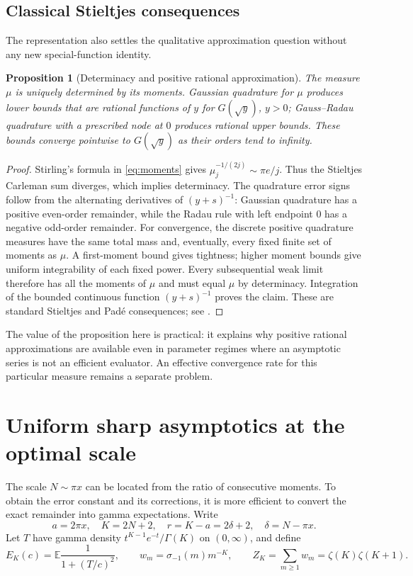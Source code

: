 \documentclass[11pt]{article}
\numberwithin{equation}{section}
\newtheorem{proposition}[theorem]{Proposition}
\theoremstyle{definition}
\theoremstyle{remark}
\newcommand{\E}{\mathbb E}
\begin{document}
\subsection{Classical Stieltjes consequences}

The representation also settles the qualitative approximation question
without any new special-function identity.

\begin{proposition}[Determinacy and positive rational approximation]
\label{prop:Stieltjes}
The measure $\mu$ is uniquely determined by its moments. Gaussian
quadrature for $\mu$ produces lower bounds that are rational functions of $y$ for
$G(\sqrt y)$, $y>0$; Gauss--Radau quadrature with a prescribed node at
$0$ produces rational upper bounds. These bounds converge pointwise to
$G(\sqrt y)$ as their orders tend to infinity.
\end{proposition}
\begin{proof}
Stirling's formula in \eqref{eq:moments} gives
$\mu_j^{-1/(2j)}\sim\pi e/j$. Thus the Stieltjes Carleman sum
diverges, which implies determinacy. The quadrature error signs follow
from the alternating derivatives of $(y+s)^{-1}$: Gaussian
quadrature has a positive even-order remainder, while the Radau rule
with left endpoint $0$ has a negative odd-order remainder.
For convergence, the discrete positive quadrature measures have the
same total mass and, eventually, every fixed finite set of moments as
$\mu$. A first-moment bound gives tightness; higher moment bounds give
uniform integrability of each fixed power. Every subsequential weak
limit therefore has all the moments of $\mu$ and must equal $\mu$ by
determinacy. Integration of the bounded continuous function
$(y+s)^{-1}$ proves the claim. These are standard Stieltjes and Pad\'e
consequences; see \cite{Simon}.
\end{proof}

The value of the proposition here is practical: it explains why
positive rational approximations are available even in parameter
regimes where an asymptotic series is not an efficient evaluator.
An effective convergence rate for this particular measure remains
a separate problem.

\section{Uniform sharp asymptotics at the optimal scale}
\label{sec:sharp}

The scale $N\sim\pi x$ can be located from the ratio of consecutive
moments. To obtain the error constant and its corrections, it is
more efficient to convert the exact remainder into gamma expectations.
Write
\begin{equation}\label{eq:gamma-notation}
 a=2\pi x,\quad K=2N+2,\quad r=K-a=2\delta+2,\quad
 \delta=N-\pi x.
\end{equation}
Let $T$ have gamma density $t^{K-1}e^{-t}/\Gamma(K)$ on $(0,\infty)$,
and define
\[
 E_K(c)=\E\frac1{1+(T/c)^2},\qquad
 w_m=\sigma_{-1}(m)m^{-K},\qquad
 Z_K=\sum_{m\ge1}w_m=\zeta(K)\zeta(K+1).
\]
\end{document}
